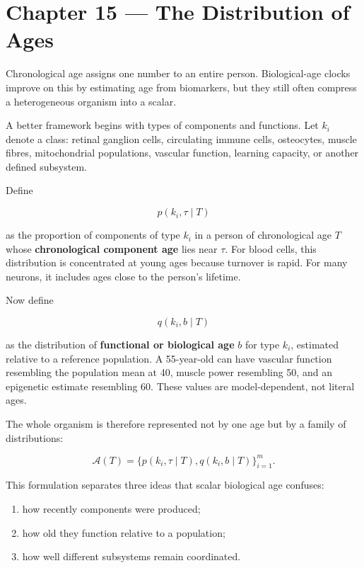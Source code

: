 \chapter{Chapter 15 --- The Distribution of Ages}\label{chapter-15-the-distribution-of-ages}

Chronological age assigns one number to an entire person. Biological-age clocks improve on this by estimating age from biomarkers, but they still often compress a heterogeneous organism into a scalar.

A better framework begins with types of components and functions. Let \(k_i\) denote a class: retinal ganglion cells, circulating immune cells, osteocytes, muscle fibres, mitochondrial populations, vascular function, learning capacity, or another defined subsystem.

Define

\[
p(k_i,\tau\mid T)
\]

as the proportion of components of type \(k_i\) in a person of chronological age \(T\) whose \textbf{chronological component age} lies near \(\tau\). For blood cells, this distribution is concentrated at young ages because turnover is rapid. For many neurons, it includes ages close to the person's lifetime.

Now define

\[
q(k_i,b\mid T)
\]

as the distribution of \textbf{functional or biological age} \(b\) for type \(k_i\), estimated relative to a reference population. A 55-year-old can have vascular function resembling the population mean at 40, muscle power resembling 50, and an epigenetic estimate resembling 60. These values are model-dependent, not literal ages.

The whole organism is therefore represented not by one age but by a family of distributions:

\[
\mathcal{A}(T)=\{p(k_i,\tau\mid T),q(k_i,b\mid T)\}_{i=1}^{m}.
\]

This formulation separates three ideas that scalar biological age confuses:

\begin{enumerate}
\def\labelenumi{\arabic{enumi}.}
\tightlist
\item
  how recently components were produced;
\item
  how old they function relative to a population;
\item
  how well different subsystems remain coordinated.
\end{enumerate}

